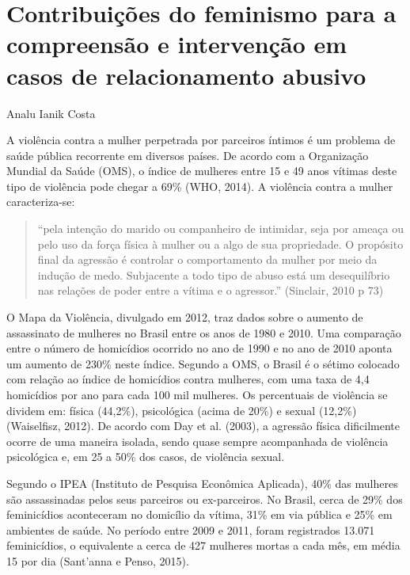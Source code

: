 \chapter{Contribuições do feminismo para a compreensão e intervenção em casos de relacionamento abusivo}
\begin{flushright}
\begin{scriptsize}
    Analu Ianik Costa
\end{scriptsize}
\vspace{1cm}
\end{flushright}

A violência contra a mulher perpetrada por parceiros íntimos é um problema de saúde pública recorrente em diversos países. De acordo com a Organização Mundial da Saúde (OMS), o índice de mulheres entre 15 e 49 anos vítimas deste tipo de violência pode chegar a 69\% (WHO, 2014). A violência contra a mulher caracteriza-se:

\begin{quote}
    “pela intenção do marido ou companheiro de intimidar, seja por ameaça ou pelo uso da força física à mulher ou a algo de sua propriedade. O propósito final da agressão é controlar o comportamento da mulher por meio da indução de medo. Subjacente a todo tipo de abuso está um desequilíbrio nas relações de poder entre a vítima e o agressor.” (Sinclair, 2010 p 73)
\end{quote}

O Mapa da Violência, divulgado em 2012, traz dados sobre o aumento de assassinato de mulheres no Brasil entre os anos de 1980 e 2010. Uma comparação entre o número de homicídios ocorrido no ano de 1990 e no ano de 2010 aponta um aumento de 230\% neste índice. Segundo a OMS, o Brasil é o sétimo colocado com relação ao índice de homicídios contra mulheres, com uma taxa de 4,4 homicídios por ano para cada 100 mil mulheres. Os percentuais de violência se dividem em: física (44,2\%), psicológica (acima de 20\%) e sexual (12,2\%) (Waiselfisz, 2012). De acordo com Day et al. (2003), a agressão física dificilmente ocorre de uma maneira isolada, sendo quase sempre acompanhada de violência psicológica e, em 25 a 50\% dos casos, de violência sexual.

Segundo o IPEA (Instituto de Pesquisa Econômica Aplicada), 40\% das mulheres são assassinadas pelos seus parceiros ou ex-parceiros. No Brasil, cerca de 29\% dos feminicídios aconteceram no domicílio da vítima, 31\% em via pública e 25\% em ambientes de saúde. No período entre 2009 e 2011, foram registrados 13.071 feminicídios, o equivalente a cerca de 427 mulheres mortas a cada mês, em média 15 por dia (Sant’anna e Penso, 2015).

